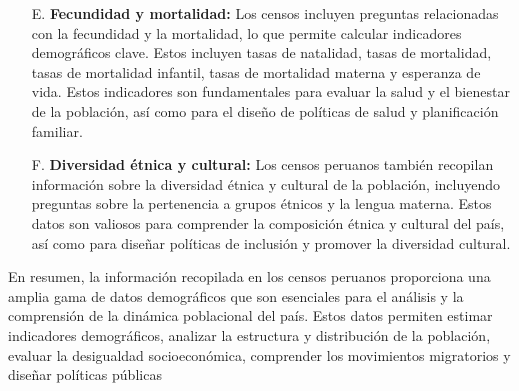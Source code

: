 \documentclass[8pt,a4paper]{beamer}
\begin{document}
{\begin{frame}{}
\begin{block}{}
\begin{enumerate}
\item[E.] \textbf{Fecundidad y mortalidad:} Los censos incluyen preguntas relacionadas con la fecundidad y la mortalidad, lo que permite calcular indicadores demográficos clave. Estos incluyen tasas de natalidad, tasas de mortalidad, tasas de mortalidad infantil, tasas de mortalidad materna y esperanza de vida. Estos indicadores son fundamentales para evaluar la salud y el bienestar de la población, así como para el diseño de políticas de salud y planificación familiar.

\end{enumerate}
\end{block}
\end{frame}


\begin{frame}{}
\begin{block}{}
\justifying
\begin{enumerate}
\justifying
\item[F.] \textbf{Diversidad étnica y cultural:} Los censos peruanos también recopilan información sobre la diversidad étnica y cultural de la población, incluyendo preguntas sobre la pertenencia a grupos étnicos y la lengua materna. Estos datos son valiosos para comprender la composición étnica y cultural del país, así como para diseñar políticas de inclusión y promover la diversidad cultural.
\end{enumerate}
En resumen, la información recopilada en los censos peruanos proporciona una amplia gama de datos demográficos que son esenciales para el análisis y la comprensión de la dinámica poblacional del país. Estos datos permiten estimar indicadores demográficos, analizar la estructura y distribución de la población, evaluar la desigualdad socioeconómica, comprender los movimientos migratorios y diseñar políticas públicas
\end{block}
\end{frame}

}
\end{document}
